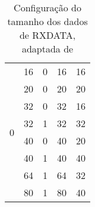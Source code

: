 \begin{enumerate}
\begin{table}[]
\begin{tabular}{|c|c|c|c|c|}
		\multirow{8}{*}{0} & 16                       & 0                           & 16                                                                                         & 16                                                                                      \\ \cline{2-5} 
		& 20                       & 0                           & 20                                                                                         & 20                                                                                      \\ \cline{2-5} 
		& 32                       & 0                           & 32                                                                                         & 16                                                                                      \\ \cline{2-5} 
		& 32                       & 1                           & 32                                                                                         & 32                                                                                      \\ \cline{2-5} 
		& 40                       & 0                           & 40                                                                                         & 20                                                                                      \\ \cline{2-5} 
		& 40                       & 1                           & 40                                                                                         & 40                                                                                      \\ \cline{2-5} 
		& 64                       & 1                           & 64                                                                                         & 32                                                                                      \\ \cline{2-5} 
		& 80                       & 1                           & 80                                                                                         & 40                                                                                      \\ \hline
	\end{tabular}
	\caption{Configuração do tamanho dos dados de RXDATA, adaptada de \cite{R011}}
	\label{table:dataRXDATA}
\end{table}

\end{enumerate}
